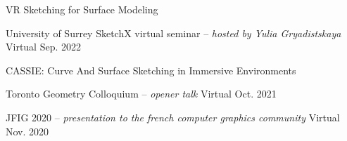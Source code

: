 \begin{cventries}
\cvtalkseries
    {VR Sketching for Surface Modeling}
    {\begin{cvtalks}
        \item {\cvtalk
            {University of Surrey SketchX virtual seminar -- \textit{hosted by Yulia Gryadistskaya}}
            {Virtual} %
            {Sep. 2022} %
            }
    \end{cvtalks}}
    

\cvtalkseries
    {CASSIE: Curve And Surface Sketching in Immersive Environments}
    {\begin{cvtalks}
        \item {\cvtalk
            {Toronto Geometry Colloquium -- \textit{opener talk}}
            {Virtual} %
            {Oct. 2021} %
            }
        \item {\cvtalk
            {JFIG 2020 -- \textit{presentation to the french computer graphics community}}
            {Virtual} %
            {Nov. 2020} %
            }
    \end{cvtalks}}

\end{cventries}
